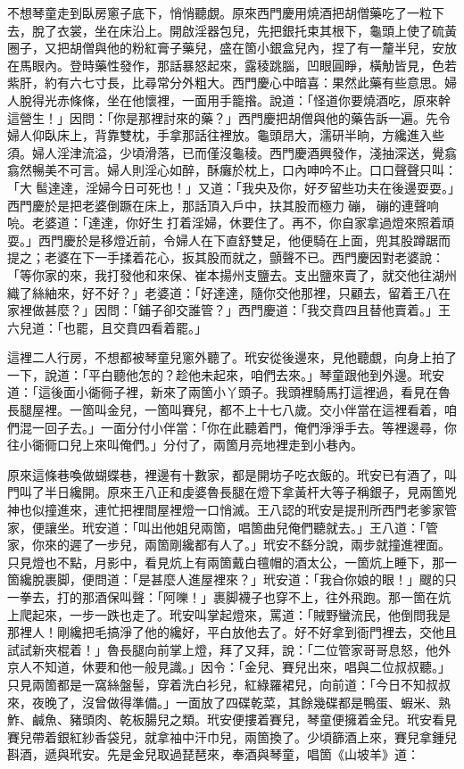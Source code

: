 不想琴童走到臥房窻子底下，悄悄聽覷。原來西門慶用燒酒把胡僧藥吃了一粒下去，脫了衣裳，坐在床沿上。開啟淫器包兒，先把銀托束其根下，龜頭上使了硫黃圈子，又把胡僧與他的粉紅膏子藥兒，盛在箇小銀盒兒內，捏了有一釐半兒，安放在馬眼內。登時藥性發作，那話暴怒起來，露稜跳腦，凹眼圓睜，橫觔皆見，色若紫肝，約有六七寸長，比尋常分外粗大。西門慶心中暗喜：果然此藥有些意思。婦人脫得光赤條條，坐在他懷裡，一面用手籠揝。說道：「怪道你要燒酒吃，原來幹這營生！」因問：「你是那裡討來的藥？」西門慶把胡僧與他的藥告訴一遍。先令婦人仰臥床上，背靠雙枕，手拿那話往裡放。龜頭昂大，濡研半晌，方纔進入些須。婦人淫津流溢，少頃滑落，已而僅沒龜稜。西門慶酒興發作，淺抽深送，覺翕翕然暢美不可言。婦人則淫心如醉，酥癱於枕上，口內呻吟不止。口口聲聲只叫：「大𩫻䯲達達，淫婦今日可死也！」又道：「我央及你，好歹留些功夫在後邊耍耍。」{}西門慶於是把老婆倒蹶在床上，那話頂入戶中，扶其股而極力𢵞磞，𢵞磞的連聲响喨。老婆道：「達達，你好生𢵞打着淫婦，休要住了。再不，你自家拿過燈來照着頑耍。」西門慶於是移燈近前，令婦人在下直舒雙足，他便騎在上面，兜其股蹲踞而提之；老婆在下一手揉着花心，扳其股而就之，顫聲不已。西門慶因對老婆說：「等你家的來，我打發他和來保、崔本揚州支鹽去。支出鹽來賣了，就交他往湖州織了絲紬來，好不好？」老婆道：「好達達，隨你交他那裡，只顧去，留着王八在家裡做甚麼？」因問：「鋪子卻交誰管？」西門慶道：「我交賁四且替他賣着。」王六兒道：「也罷，且交賁四看着罷。」

這裡二人行房，不想都被琴童兒窻外聽了。玳安從後邊來，見他聽覷，向身上拍了一下，說道：「平白聽他怎的？趁他未起來，咱們去來。」琴童跟他到外邊。玳安道：「這後面小衚衕子裡，新來了兩箇小丫頭子。我頭裡騎馬打這裡過，看見在魯長腿屋裡。一箇叫金兒，一箇叫賽兒，都不上十七八歲。交小伴當在這裡看着，咱們混一回子去。」一面分付小伴當：「你在此聽着門，俺們淨淨手去。等裡邊尋，你往小衚衕口兒上來叫俺們。」分付了，兩箇月亮地裡走到小巷內。

原來這條巷喚做蝴蝶巷，裡邊有十數家，都是開坊子吃衣飯的。玳安已有酒了，叫門叫了半日纔開。原來王八正和虔婆魯長腿在燈下拿黃杆大等子稱銀子，見兩箇兇神也似撞進來，連忙把裡間屋裡燈一口悄滅。王八認的玳安是提刑所西門老爹家管家，便讓坐。玳安道：「叫出他姐兒兩箇，唱箇曲兒俺們聽就去。」王八道：「管家，你來的遲了一步兒，兩箇剛纔都有人了。」玳安不繇分說，兩步就撞進裡面。只見燈也不點，月影中，看見炕上有兩箇戴白氊帽的酒太公，一箇炕上睡下，那一箇纔脫裹脚，便問道：「是甚麼人進屋裡來？」玳安道：「我㒲你娘的眼！」颼的只一拳去，打的那酒保叫聲：「阿嚛！」裹脚襪子也穿不上，往外飛跑。那一箇在炕上爬起來，一步一跌也走了。玳安叫掌起燈來，罵道：「賊野蠻流民，他倒問我是那裡人！剛纔把毛搞淨了他的纔好，平白放他去了。好不好拿到衙門裡去，交他且試試新夾棍着！」魯長腿向前掌上燈，拜了又拜，說：「二位管家哥哥息怒，他外京人不知道，休要和他一般見識。」因令：「金兒、賽兒出來，唱與二位叔叔聽。」只見兩箇都是一窩絲盤髻，穿着洗白衫兒，紅綠羅裙兒，向前道：「今日不知叔叔來，夜晚了，沒曾做得準備。」一面放了四碟乾菜，其餘幾碟都是鴨蛋、蝦米、熟鮓、鹹魚、豬頭肉、乾板腸兒之類。{}玳安便摟着賽兒，琴童便擁着金兒。玳安看見賽兒帶着銀紅紗香袋兒，就拿袖中汗巾兒，兩箇換了。少頃篩酒上來，賽兒拿鍾兒斟酒，遞與玳安。先是金兒取過琵琶來，奉酒與琴童，唱箇《山坡羊》道：

